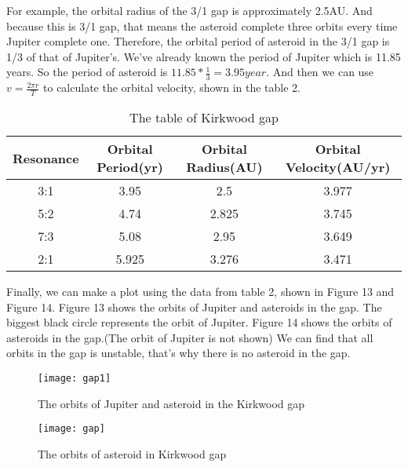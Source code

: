 \documentclass{article}
\begin{document}
For example, the orbital radius of the 3/1 gap is approximately 2.5AU. And because this is 3/1 gap, that means the asteroid complete three orbits every time Jupiter complete one. Therefore, the orbital period of asteroid in the 3/1 gap is 1/3 of that of Jupiter's. We've already known the period of Jupiter which is 11.85 years. So the period of asteroid is $11.85*\frac{1}{3}=3.95 year$. And then we can use $v=\frac{2\pi r}{T}$ to calculate the orbital velocity, shown in the table 2.
\begin{table}[h!]
\centering
\begin{tabular}{ ||c|c|c|c|| } 
 \hline
 Resonance & Orbital Period(yr) & Orbital Radius(AU) & Orbital Velocity(AU/yr) \\ 
 \hline
 \hline
 3:1 & 3.95 & 2.5 & 3.977\\ 
 5:2 & 4.74 & 2.825 & 3.745\\
 7:3 & 5.08 & 2.95 & 3.649\\
 2:1 & 5.925 & 3.276 & 3.471\\
 \hline
 \end{tabular}
\caption{The table of Kirkwood gap}
 \end{table}

Finally, we can make a plot using the data from table 2, shown in Figure 13 and Figure 14. Figure 13 shows the orbits of Jupiter and asteroids in the gap. The biggest black circle represents the orbit of Jupiter. Figure 14 shows the orbits of asteroids in the gap.(The orbit of Jupiter is not shown) We can find that all orbits in the gap is unstable, that's why there is no asteroid in the gap.
\begin{figure}
\centering
\texttt{[image: gap1]} 
\caption{The orbits of Jupiter and asteroid in the Kirkwood gap}
\label{Fig:13} 
\end{figure}
\begin{figure}
\centering
\texttt{[image: gap]} 
\caption{The orbits of asteroid in Kirkwood gap}
\label{Fig:14} 
\end{figure}
\end{document}
